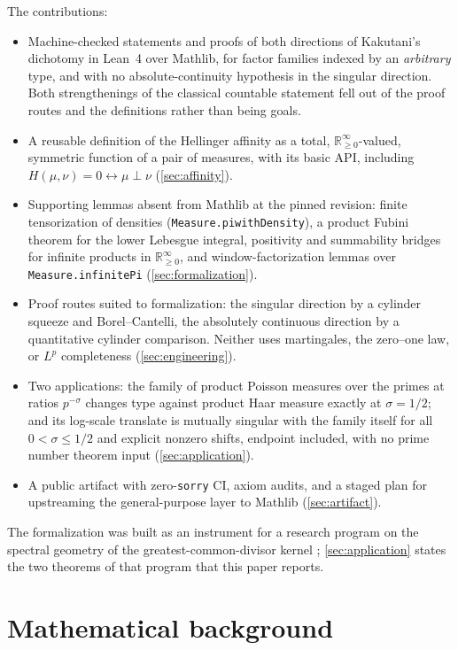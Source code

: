 \documentclass[a4paper,UKenglish,autoref,thm-restate]{lipics-v2021}
\newcommand{\ennreal}{\ensuremath{\mathbb{R}_{\ge 0}^{\infty}}}
\newcommand{\leanid}[1]{{\def\_{\textunderscore\allowbreak}\texttt{#1}}}
\begin{document}
The contributions:
\begin{itemize}
\item Machine-checked statements and proofs of both directions of Kakutani's
  dichotomy in Lean~4 over Mathlib, for factor families indexed by an
  \emph{arbitrary} type, and with no absolute-continuity hypothesis in the
  singular direction. Both strengthenings of the classical countable
  statement fell out of the proof routes and the definitions rather than
  being goals.
\item A reusable definition of the Hellinger affinity as a total,
  \ennreal-valued, symmetric function of a pair of measures, with its basic
  API, including $H(\mu,\nu) = 0 \leftrightarrow \mu \perp \nu$
  (\autoref{sec:affinity}).
\item Supporting lemmas absent from Mathlib at the pinned revision: finite
  tensorization of densities (\leanid{Measure.pi\_withDensity}), a product
  Fubini theorem for the lower Lebesgue integral, positivity and summability
  bridges for infinite products in \ennreal, and window-factorization lemmas
  over \leanid{Measure.infinitePi} (\autoref{sec:formalization}).
\item Proof routes suited to formalization: the singular direction by a
  cylinder squeeze and Borel--Cantelli, the absolutely continuous direction by
  a quantitative cylinder comparison. Neither uses martingales, the zero--one
  law, or $L^p$ completeness (\autoref{sec:engineering}).
\item Two applications: the family of product Poisson measures over the primes
  at ratios $p^{-\sigma}$ changes type against product Haar measure exactly at
  $\sigma = 1/2$; and its log-scale translate is mutually singular with the
  family itself for all $0 < \sigma \le 1/2$ and explicit nonzero shifts,
  endpoint included, with no prime number theorem input
  (\autoref{sec:application}).
\item A public artifact with zero-\texttt{sorry} CI, axiom audits, and a
  staged plan for upstreaming the general-purpose layer to Mathlib
  (\autoref{sec:artifact}).
\end{itemize}

The formalization was built as an instrument for a research program on the
spectral geometry of the greatest-common-divisor kernel \cite{riemannvenue};
\autoref{sec:application} states the two theorems of that program that this
paper reports.

\section{Mathematical background}
\label{sec:background}
\end{document}
